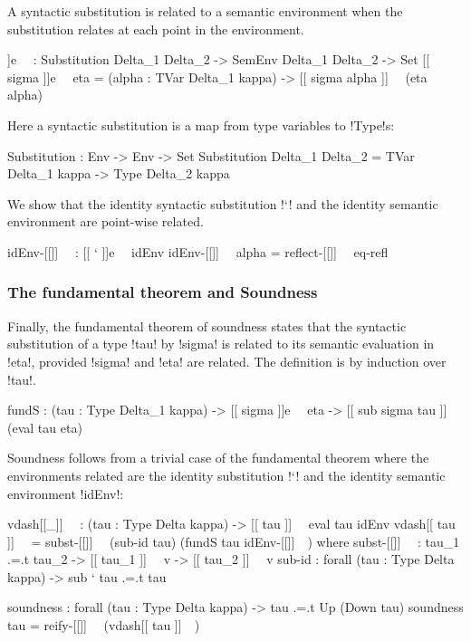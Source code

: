 \documentclass[sigplan,10pt,anonymous,review]{acmart}\settopmatter{printfolios=true,printccs=false,printacmref=false}
\begin{document}
A syntactic substitution is related to a semantic environment when the substitution relates at each point in the environment.

\begin{agda}
[[_]]e~~ : Substitution Delta_1  Delta_2 -> SemEnv Delta_1  Delta_2 -> Set 
[[ sigma ]]e~~ eta = (alpha : TVar Delta_1 kappa) -> [[ sigma alpha ]]~~ (eta alpha)
\end{agda}

Here a syntactic substitution is a map from type variables to !Type!s: 

\begin{agda}
Substitution : Env -> Env -> Set
Substitution Delta_1  Delta_2 = TVar Delta_1 kappa -> Type Delta_2 kappa
\end{agda}

We show that the identity syntactic substitution !`! and the identity semantic environment are point-wise related. 

\begin{agda}
idEnv-[[]]~~ : [[ ` ]]e~~ idEnv 
idEnv-[[]]~~ alpha = reflect-[[]]~~ eq-refl
\end{agda}

\subsubsection{The fundamental theorem and Soundness}

Finally, the fundamental theorem of soundness states that the syntactic substitution of a type !tau! by !sigma! is related to its semantic evaluation in !eta!, provided !sigma! and !eta! are related. The definition is by induction over !tau!.

\begin{agda}
fundS : (tau : Type Delta_1 kappa) -> 
        [[ sigma ]]e~~ eta -> 
        [[ sub sigma tau ]]~~ (eval tau eta)
\end{agda}

Soundness follows from a trivial case of the fundamental theorem where the environments related are the identity substitution !`! and the identity semantic environment !idEnv!:

\begin{agda}
vdash[[_]]~~ : (tau : Type Delta kappa)  -> [[ tau ]]~~ eval tau idEnv  
vdash[[ tau ]]~~ = 
  subst-[[]]~~ (sub-id tau) (fundS tau idEnv-[[]]~~)
  where
    subst-[[]]~~ : tau_1 .=.t tau_2 -> [[ tau_1 ]]~~ v -> [[ tau_2 ]]~~ v
    sub-id : forall (tau : Type Delta kappa) -> sub ` tau .=.t tau

soundness : forall (tau : Type Delta kappa) -> tau .=.t Up (Down tau)
soundness tau =  reify-[[]]~~ (vdash[[ tau ]]~~)
\end{agda}
\end{document}
